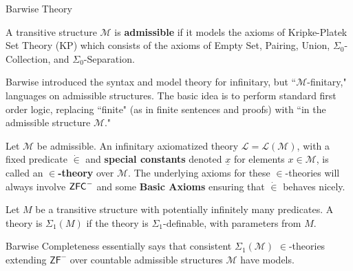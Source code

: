 \documentclass[utf8x,xcolor=svgnames,8pt]{beamer}
\newcommand{\M}{\mathcal{M}}
\newcommand{\ZFC}{\textup{\ensuremath{\textsf{ZFC}}}}
\begin{document}
\begin{frame}{Barwise Theory}
\begin{definition} A transitive structure $\M$ is \textbf{admissible} if it models the axioms of \textsf{Kripke-Platek Set Theory} (\textsf{KP}) which consists of the axioms of \textsf{Empty Set}, \textsf{Pairing}, \textsf{Union}, $\Sigma_0$-\textsf{Collection}, and $\Sigma_0$-\textsf{Separation}. \end{definition}

Barwise introduced the syntax and model theory for infinitary, but ``$\M$-finitary," languages on admissible structures. The basic idea is to perform standard first order logic, replacing ``finite" (as in finite sentences and proofs) with ``in the admissible structure $\mathcal M$."

%
\begin{definition}[$\in$-theory] Let $\M$ be admissible. An infinitary axiomatized theory $\mathcal L=\mathcal L(\M)$, with a fixed predicate $\dot \in$ and \textbf{special constants} denoted $\underline x$ for elements $x \in \M$, is called an \textbf{$\in$-theory} over $\M$. The underlying axioms for these $\in$-theories will always involve $\ZFC^-$ and some \textbf{Basic Axioms} ensuring that $\dot \in$ behaves nicely. \end{definition}

\begin{definition} Let $M$ be a transitive structure with potentially infinitely many predicates. A theory is $\Sigma_1(M)$ if the theory is $\Sigma_1$-definable, with parameters from $M$. \end{definition}

Barwise Completeness essentially says that consistent $\Sigma_1(\M)$ $\in$-theories extending $\textsf{ZF}^-$ over countable admissible structures $\M$ have models.
\end{frame}
\end{document}
